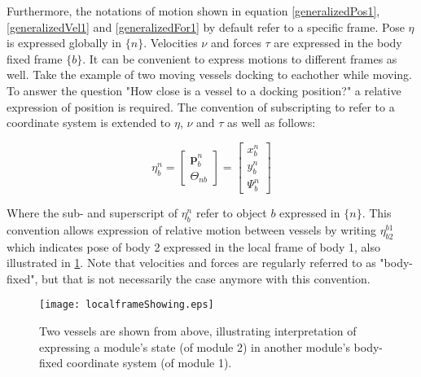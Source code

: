 Furthermore, the notations of motion shown in equation \ref{generalizedPos1}, \ref{generalizedVel1} and \ref{generalizedFor1} by default refer to a specific frame. Pose $\eta$ is expressed globally in $\{n\}$. Velocities $\nu$ and  forces $\tau$ are expressed in the body fixed frame $\{b\}$. It can be convenient to express motions to different frames as well. Take the example of two moving vessels docking to eachother while moving. To answer the question "How close is a vessel to a docking position?" a relative expression of position is required. The convention of subscripting to refer to a coordinate system is extended to $\eta$, $\nu$ and $\tau$ as well as follows:

\begin{equation}
\eta_b^n = \begin{bmatrix} \textbf{p}^{n}_{b} \\[8pt]  \Theta_{nb} \end{bmatrix} = \begin{bmatrix} x^{n}_{b} \\[8pt]  y^{n}_{b} \\[8pt] \Psi^n_b \end{bmatrix}
\label{generalizedPos2}
\end{equation}

Where the sub- and superscript of $\eta_b^n$ refer to object $b$ expressed in $\{n\}$. This convention allows expression of relative motion between vessels by writing $\eta_{b2}^{b1}$ which indicates pose of body 2 expressed in the local frame of body 1, also illustrated in \ref{fig:localframeShowing}. Note that velocities and forces are regularly referred to as "body-fixed", but that is not necessarily the case anymore with this convention. 

\begin{figure}[h!]
	\centering
	\texttt{[image: localframeShowing.eps]}
	\caption{Two vessels are shown from above, illustrating interpretation of expressing a module's state (of module 2) in another module's body-fixed coordinate system (of module 1).}
	\label{fig:localframeShowing}
\end{figure}
\newpage